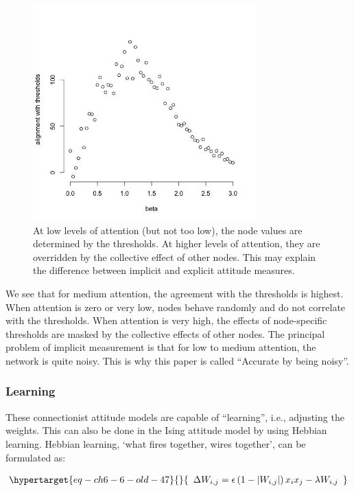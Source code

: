\documentclass[
  letterpaper,
]{scrbook}
\begin{document}
\begin{figure}

{\centering \includegraphics[width=3.37956in,height=\textheight]{media/ch6/image13.jpg}

}

\caption{\label{fig-ch6-img13-old-82}At low levels of attention (but not
too low), the node values are determined by the thresholds. At higher
levels of attention, they are overridden by the collective effect of
other nodes. This may explain the difference between implicit and
explicit attitude measures.}

\end{figure}

We see that for medium attention, the agreement with the thresholds is
highest. When attention is zero or very low, nodes behave randomly and
do not correlate with the thresholds. When attention is very high, the
effects of node-specific thresholds are masked by the collective effects
of other nodes. The principal problem of implicit measurement is that
for low to medium attention, the network is quite noisy. This is why
this paper is called ``Accurate by being noisy''.

\hypertarget{learning}{%
\subsubsection{Learning}\label{learning}}

These connectionist attitude models are capable of ``learning'', i.e.,
adjusting the weights. This can also be done in the Ising attitude model
by using Hebbian learning. Hebbian learning, `what fires together, wires
together', can be formulated as:

\emph{\hfill\break
}\begin{equation}\protect\hypertarget{eq-ch6-6-old-47}{}{\begin{array}{r}
\mathrm{\Delta}W_{i,j} = \epsilon\left( 1 - \left| W_{i,j} \right| \right)x_{i}x_{j} - \lambda W_{i,j}
\end{array}}\label{eq-ch6-6-old-47}\end{equation}
\end{document}
